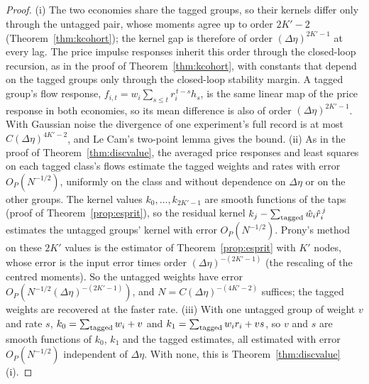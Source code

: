 \documentclass[12pt]{article}
\theoremstyle{definition}
\theoremstyle{remark}
\begin{document}
\begin{proof}
(i) The two economies share the tagged groups, so their kernels differ only through the untagged pair, whose moments agree up to order $2K'-2$ (Theorem~\ref{thm:kcohort}); the kernel gap is therefore of order $(\Delta\eta)^{2K'-1}$ at every lag. The price impulse responses inherit this order through the closed-loop recursion, as in the proof of Theorem~\ref{thm:kcohort}, with constants that depend on the tagged groups only through the closed-loop stability margin. A tagged group's flow response, $f_{i,t}=w_i\sum_{s\le t}r_i^{\,t-s}h_s$, is the same linear map of the price response in both economies, so its mean difference is also of order $(\Delta\eta)^{2K'-1}$. With Gaussian noise the divergence of one experiment's full record is at most $C(\Delta\eta)^{4K'-2}$, and Le Cam's two-point lemma gives the bound.
(ii) As in the proof of Theorem~\ref{thm:discvalue}, the averaged price responses and least squares on each tagged class's flows estimate the tagged weights and rates with error $O_P(N^{-1/2})$, uniformly on the class and without dependence on $\Delta\eta$ or on the other groups. The kernel values $k_0,\ldots,k_{2K'-1}$ are smooth functions of the taps (proof of Theorem~\ref{prop:esprit}), so the residual kernel $k_j-\sum_{\rm tagged}\hat w_i\hat r_i^{\,j}$ estimates the untagged groups' kernel with error $O_P(N^{-1/2})$. Prony's method on these $2K'$ values is the estimator of Theorem~\ref{prop:esprit} with $K'$ nodes, whose error is the input error times order $(\Delta\eta)^{-(2K'-1)}$ (the rescaling of the centred moments). So the untagged weights have error $O_P(N^{-1/2}(\Delta\eta)^{-(2K'-1)})$, and $N=C(\Delta\eta)^{-(4K'-2)}$ suffices; the tagged weights are recovered at the faster rate.
(iii) With one untagged group of weight $v$ and rate $s$, $k_0=\sum_{\rm tagged}w_i+v$ and $k_1=\sum_{\rm tagged}w_ir_i+vs$, so $v$ and $s$ are smooth functions of $k_0$, $k_1$ and the tagged estimates, all estimated with error $O_P(N^{-1/2})$ independent of $\Delta\eta$. With none, this is Theorem~\ref{thm:discvalue}(i).
\end{proof}
\end{document}
